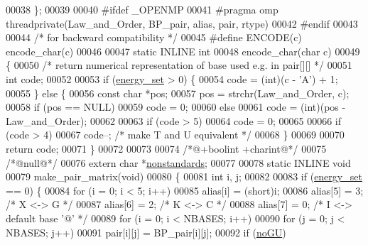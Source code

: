 \begin{DoxyCode}
00038 \};
00039 
00040 \textcolor{preprocessor}{#ifdef \_OPENMP}
00041 \textcolor{preprocessor}{#pragma omp threadprivate(Law\_and\_Order, BP\_pair, alias, pair, rtype)}
00042 \textcolor{preprocessor}{#endif}
00043 
00044 \textcolor{comment}{/* for backward compatibility */}
00045 \textcolor{preprocessor}{#define ENCODE(c) encode\_char(c)}
00046 
00047 \textcolor{keyword}{static} INLINE \textcolor{keywordtype}{int}
00048 encode\_char(\textcolor{keywordtype}{char} c)
00049 \{
00050   \textcolor{comment}{/* return numerical representation of base used e.g. in pair[][] */}
00051   \textcolor{keywordtype}{int} code;
00052 
00053   \textcolor{keywordflow}{if} (\hyperlink{group__model__details_gafb1ef1166da85092ae8a325e02dcae71}{energy\_set} > 0) \{
00054     code = (int)(c - \textcolor{charliteral}{'A'}) + 1;
00055   \} \textcolor{keywordflow}{else} \{
00056     \textcolor{keyword}{const} \textcolor{keywordtype}{char} *pos;
00057     pos = strchr(Law\_and\_Order, c);
00058     \textcolor{keywordflow}{if} (pos == NULL)
00059       code = 0;
00060     \textcolor{keywordflow}{else}
00061       code = (int)(pos - Law\_and\_Order);
00062 
00063     \textcolor{keywordflow}{if} (code > 5)
00064       code = 0;
00065 
00066     \textcolor{keywordflow}{if} (code > 4)
00067       code--;           \textcolor{comment}{/* make T and U equivalent */}
00068   \}
00069 
00070   \textcolor{keywordflow}{return} code;
00071 \}
00072 
00073 
00074 \textcolor{comment}{/*@+boolint +charint@*/}
00075 \textcolor{comment}{/*@null@*/}
00076 \textcolor{keyword}{extern} \textcolor{keywordtype}{char} *\hyperlink{group__model__details_ga2695d91cc535d09c2eae5c3884e2ec64}{nonstandards};
00077 
00078 \textcolor{keyword}{static} INLINE \textcolor{keywordtype}{void}
00079 make\_pair\_matrix(\textcolor{keywordtype}{void})
00080 \{
00081   \textcolor{keywordtype}{int} i, j;
00082 
00083   \textcolor{keywordflow}{if} (\hyperlink{group__model__details_gafb1ef1166da85092ae8a325e02dcae71}{energy\_set} == 0) \{
00084     \textcolor{keywordflow}{for} (i = 0; i < 5; i++)
00085       alias[i] = (\textcolor{keywordtype}{short})i;
00086     alias[5]  = 3;  \textcolor{comment}{/* X <-> G */}
00087     alias[6]  = 2;  \textcolor{comment}{/* K <-> C */}
00088     alias[7]  = 0;  \textcolor{comment}{/* I <-> default base '@' */}
00089     \textcolor{keywordflow}{for} (i = 0; i < NBASES; i++)
00090       \textcolor{keywordflow}{for} (j = 0; j < NBASES; j++)
00091         pair[i][j] = BP\_pair[i][j];
00092     \textcolor{keywordflow}{if} (\hyperlink{group__model__details_gabf380d09e4f1ab94fc6af57cf0ad5d32}{noGU})

\end{DoxyCode}
